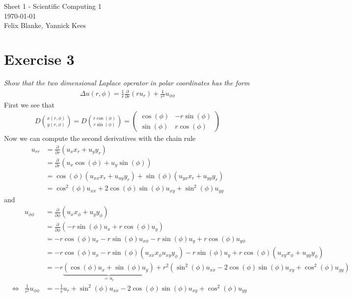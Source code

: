 \documentclass[11pt, a4paper, german]{article}
\begin{document}
\begin{center}

{\huge Sheet 1 - Scientific Computing 1 } 
\vspace*{1\baselineskip}\\ 
\small{\today}
\vspace*{1\baselineskip}\\

{\small Felix Blanke, Yannick Kees}
\vspace*{1\baselineskip}\\

\end{center}
	\section*{Exercise 3}
	\textit{Show that the two dimensional Laplace operator in polar coordinates has the form}\begin{align*}
		\Delta u(r,\phi )=\frac{1}{r}\frac{\partial}{\partial r}\left(r u_r \right)+\frac{1}{r^2}u_{\phi\phi}
	\end{align*}
	First we see that\begin{align*}
		D{x(r,\phi)\choose y(r,\phi)}=D{r\cos(\phi)\choose r\sin(\phi)}=\begin{pmatrix}
			\cos(\phi) & -r\sin(\phi)  \\ \sin(\phi) & r\cos(\phi)
		\end{pmatrix}
	\end{align*}
	Now we can compute the second derivatives with the chain rule\begin{align*}
		u_{rr}&=\frac{\partial}{\partial r}\left( u_xx_r+u_yy_r \right)\\
		&=\frac{\partial}{\partial r}\left( u_x\cos(\phi) +u_y\sin(\phi) \right)\\
		&=  \cos(\phi)\left(u_{xx}x_r+u_{uy}y_r \right) +\sin(\phi)\left(u_{yx}x_r+u_{yy}y_r \right) \\
		&=\cos^2(\phi) u_{xx}+2\cos(\phi)\sin(\phi)u_{xy}+\sin^2(\phi)u_{yy}
	\end{align*}
	and\begin{align*}
		&&u_{\phi\phi}&=\frac{\partial}{\partial \phi}\left( u_xx_\phi+u_yy_\phi \right)\\
		&&&=\frac{\partial}{\partial \phi}\left( -r\sin(\phi)u_x+r\cos(\phi)u_y \right) \\
		&&&= -r\cos(\phi)u_x-r\sin(\phi)u_{x\phi}-r\sin(\phi)u_{y}+r\cos(\phi)u_{y\phi}  \\
		&&&= -r\cos(\phi)u_x-r\sin(\phi)(u_{xx}x_{\phi}u_{xy}y_\phi)-r\sin(\phi)u_{y}+r\cos(\phi)(u_{xy}x_\phi+u_{yy}y_\phi)  \\
		&&&=-r\underbrace{(\cos(\phi)u_x+\sin(\phi)u_y)}_{=u_r}+r^2\left( \sin^2(\phi)u_{xx}-2\cos(\phi)\sin(\phi)u_{xy}+\cos^2(\phi)u_{yy} \right)\\
		& \Leftrightarrow& \frac{1}{r^2}u_{\phi\phi}&=-\frac{1}{r}u_r+\sin^2(\phi)u_{xx}-2\cos(\phi)\sin(\phi)u_{xy}+\cos^2(\phi)u_{yy}
	\end{align*}
\end{document}
